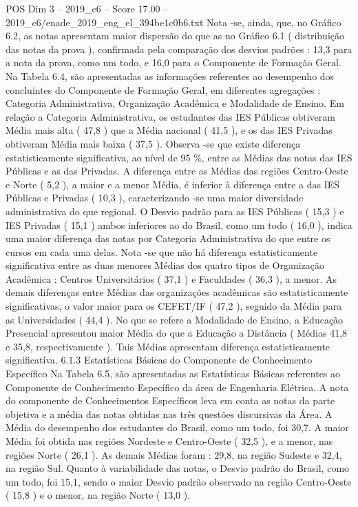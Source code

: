 \begin{textsample}{POS Dim 3 – 2019\_c6 – Score 17.00 – 2019\_c6/enade\_2019\_eng\_el\_394be1c0b6.txt}
Nota -se, ainda, que, no Gráfico 6.2, as notas apresentam maior dispersão do que as no Gráfico 6.1 ( distribuição das notas da prova ), confirmada pela comparação dos desvios padrões : 13,3 para a nota da prova, como um todo, e 16,0 para o Componente de Formação Geral.
Na Tabela 6.4, são apresentadas as informações referentes ao desempenho dos concluintes do Componente de Formação Geral, em diferentes agregações : Categoria Administrativa, Organização Acadêmica e Modalidade de Ensino.
Em relação a Categoria Administrativa, os estudantes das IES Públicas obtiveram Média mais alta ( 47,8 ) que a Média nacional ( 41,5 ), e os das IES Privadas obtiveram Média mais baixa ( 37,5 ).
Observa -se que existe diferença estatisticamente significativa, ao nível de 95 \%, entre as Médias das notas das IES Públicas e as das Privadas.
A diferença entre as Médias das regiões Centro-Oeste e Norte ( 5,2 ), a maior e a menor Média, é inferior à diferença entre a das IES Públicas e Privadas ( 10,3 ), caracterizando -se uma maior diversidade administrativa do que regional.
O Desvio padrão para as IES Públicas ( 15,3 ) e IES Privadas ( 15,1 ) ambos inferiores ao do Brasil, como um todo ( 16,0 ), indica uma maior diferença das notas por Categoria Administrativa do que entre os cursos em cada uma delas.
Nota -se que não há diferença estatisticamente significativa entre as duas menores Médias dos quatro tipos de Organização Acadêmica : Centros Universitários ( 37,1 ) e Faculdades ( 36,3 ), a menor.
As demais diferenças entre Médias das organizações acadêmicas são estatisticamente significativas, o valor maior para os CEFET/IF ( 47,2 ), seguido da Média para as Universidades ( 44,4 ).
No que se refere a Modalidade de Ensino, a Educação Presencial apresentou maior Média do que a Educação a Distância ( Médias 41,8 e 35,8, respectivamente ).
Tais Médias apresentam diferença estatisticamente significativa. 6.1.3 Estatísticas Básicas do Componente de Conhecimento Específico Na Tabela 6.5, são apresentadas as Estatísticas Básicas referentes ao Componente de Conhecimento Específico da área de Engenharia Elétrica.
A nota do componente de Conhecimentos Específicos leva em conta as notas da parte objetiva e a média das notas obtidas nas três questões discursivas da Área.
A Média do desempenho dos estudantes do Brasil, como um todo, foi 30,7.
A maior Média foi obtida nas regiões Nordeste e Centro-Oeste ( 32,5 ), e a menor, nas regiões Norte ( 26,1 ).
As demais Médias foram : 29,8, na região Sudeste e 32,4, na região Sul.
Quanto à variabilidade das notas, o Desvio padrão do Brasil, como um todo, foi 15,1, sendo o maior Desvio padrão observado na região Centro-Oeste ( 15,8 ) e o menor, na região Norte ( 13,0 ).

\end{textsample}

